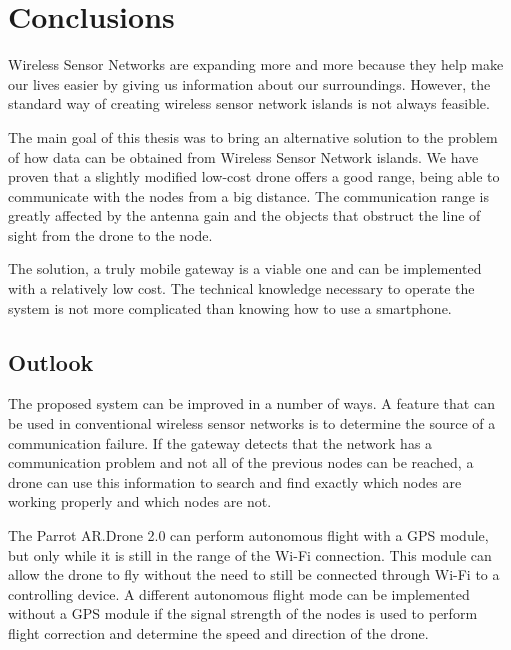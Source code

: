 \chapter{Conclusions}


Wireless Sensor Networks are expanding more and more because they help make our lives easier by giving us information about our surroundings. However, the standard way of creating wireless sensor network islands is not always feasible.

The main goal of this thesis was to bring an alternative solution to the problem of how data can be obtained from Wireless Sensor Network islands. We have proven that a slightly modified low-cost drone offers a good range, being able to communicate with the nodes from a big distance. The communication range is greatly affected by the antenna gain and the objects that obstruct the line of sight from the drone to the node.


The solution, a truly mobile gateway is a viable one and can be implemented with a relatively low cost. The technical knowledge necessary to operate the system is not more complicated than knowing how to use a smartphone.




\section{Outlook}

The proposed system can be improved in a number of ways. A feature that can be used in conventional wireless sensor networks is to determine the source of a communication failure. If the gateway detects that the network has a communication problem and not all of the previous nodes can be reached, a drone can use this information to search and find exactly which nodes are working properly and which nodes are not.

The Parrot AR.Drone 2.0 can perform autonomous flight with a GPS module, but only while it is still in the range of the Wi-Fi connection. This module can allow the drone to fly without the need to still be connected through Wi-Fi to a controlling device. A different autonomous flight mode can be implemented without a GPS module if the signal strength of the nodes is used to perform flight correction and determine the speed and direction of the drone.

